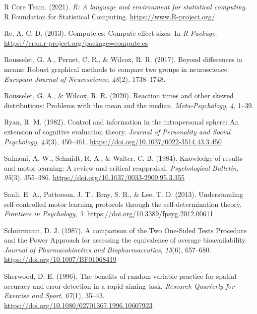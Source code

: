 \documentclass[
  man, donotrepeattitle,floatsintext]{apa7}
\newlength{\cslhangindent}
\newlength{\cslentryspacingunit} %
\newenvironment{CSLReferences}[2] %
 {%
  \setlength{\parindent}{0pt}
  \ifodd #1
  \let\oldpar\par
  \def\par{\hangindent=\cslhangindent\oldpar}
  \fi
  \setlength{\parskip}{#2\cslentryspacingunit}
 }%
 {}
\begin{document}
\begin{CSLReferences}{1}{0}
\leavevmode{}%
R Core Team. (2021). \emph{R: A language and environment for statistical computing}. R Foundation for Statistical Computing. \url{https://www.R-project.org/}

\leavevmode{}%
Re, A. C. D. (2013). Compute.es: Compute effect sizes. In \emph{R Package}. \url{https://cran.r-project.org/package=compute.es}

\leavevmode{}%
Rousselet, G. A., Pernet, C. R., \& Wilcox, R. R. (2017). Beyond differences in means: Robust graphical methods to compare two groups in neuroscience. \emph{European Journal of Neuroscience}, \emph{46}(2), 1738--1748.

\leavevmode{}%
Rousselet, G. A., \& Wilcox, R. R. (2020). Reaction times and other skewed distributions: Problems with the mean and the median. \emph{Meta-Psychology}, \emph{4}, 1--39.

\leavevmode{}%
Ryan, R. M. (1982). Control and information in the intrapersonal sphere: {An} extension of cognitive evaluation theory. \emph{Journal of Personality and Social Psychology}, \emph{43}(3), 450--461. \url{https://doi.org/10.1037/0022-3514.43.3.450}

\leavevmode{}%
Salmoni, A. W., Schmidt, R. A., \& Walter, C. B. (1984). Knowledge of results and motor learning: A review and critical reappraisal. \emph{Psychological Bulletin}, \emph{95}(3), 355--386. \url{https://doi.org/10.1037/0033-2909.95.3.355}

\leavevmode{}%
Sanli, E. A., Patterson, J. T., Bray, S. R., \& Lee, T. D. (2013). Understanding self-controlled motor learning protocols through the self-determination theory. \emph{Frontiers in Psychology}, \emph{3}. \url{https://doi.org/10.3389/fpsyg.2012.00611}

\leavevmode{}%
Schuirmann, D. J. (1987). A comparison of the Two One-Sided Tests Procedure and the Power Approach for assessing the equivalence of average bioavailability. \emph{Journal of Pharmacokinetics and Biopharmaceutics}, \emph{15}(6), 657--680. \url{https://doi.org/10.1007/BF01068419}

\leavevmode{}%
Sherwood, D. E. (1996). The benefits of random variable practice for spatial accuracy and error detection in a rapid aiming task. \emph{Research Quarterly for Exercise and Sport}, \emph{67}(1), 35--43. \url{https://doi.org/10.1080/02701367.1996.10607923}


\end{CSLReferences}
\end{document}
